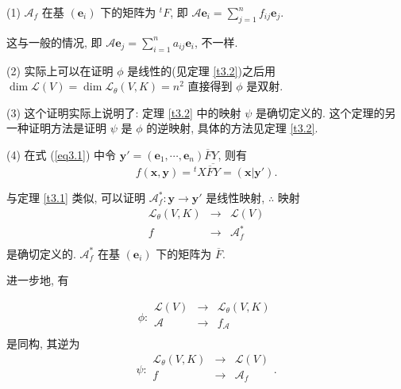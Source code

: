\documentclass{ctexart}
\begin{document}
\begin{note}
    (1) $\mathcal{A}_f$ 在基 $(\boldsymbol{e}_i)$ 下的矩阵为 ${}^tF$, 即 $\mathcal{A}\boldsymbol{e}_i=\sum\limits_{j=1}^nf_{ij}\boldsymbol{e}_j$.

    这与一般的情况, 即 $\mathcal{A}\boldsymbol{e}_j=\sum\limits_{i=1}^na_{ij}\boldsymbol{e}_i$, 不一样.

    (2) 实际上可以在证明 $\phi$ 是线性的(见定理 \ref{t3.2})之后用 $\dim\mathcal{L}(V)=\dim\mathcal{L}_\theta(V,K)=n^2$ 直接得到 $\phi$ 是双射.

    (3) 这个证明实际上说明了: 定理 \ref{t3.2} 中的映射 $\psi$ 是确切定义的. 这个定理的另一种证明方法是证明 $\psi$ 是 $\phi$ 的逆映射, 具体的方法见定理 \ref{t3.2}.

    (4) 在式 (\ref{eq3.1}) 中令 $\boldsymbol{y}'=(\boldsymbol{e}_1,\cdots,\boldsymbol{e}_n)\overline{F}Y$, 则有
    \[f(\boldsymbol{x},\boldsymbol{y})={}^tX\overline{\overline{F}Y}=(\boldsymbol{x}|\boldsymbol{y}').\]

    与定理 \ref{t3.1} 类似, 可以证明 $\mathcal{A}^*_f:\boldsymbol{y}\to\boldsymbol{y}'$ 是线性映射, $\therefore$ 映射
    \[\begin{array}{rcl}
        \mathcal{L}_\theta(V,K) & \to & \mathcal{L}(V) \\
        f & \to & \mathcal{A}^*_f \\
    \end{array}\]
    是确切定义的. $\mathcal{A}^*_f$ 在基 $(\boldsymbol{e}_i)$ 下的矩阵为 $\overline{F}$.
\end{note}
进一步地, 有
\begin{theorem}\label{t3.2}
    \[\phi:\begin{array}{rcl}
        \mathcal{L}(V) & \to & \mathcal{L}_\theta(V,K) \\
        \mathcal{A} & \to & f_\mathcal{A} \\
    \end{array}\]
    是同构, 其逆为
    \[\psi:\begin{array}{rcl}
        \mathcal{L}_\theta(V,K) & \to & \mathcal{L}(V) \\
        f & \to & \mathcal{A}_f \\
    \end{array}.\]
\end{theorem}
\end{document}
